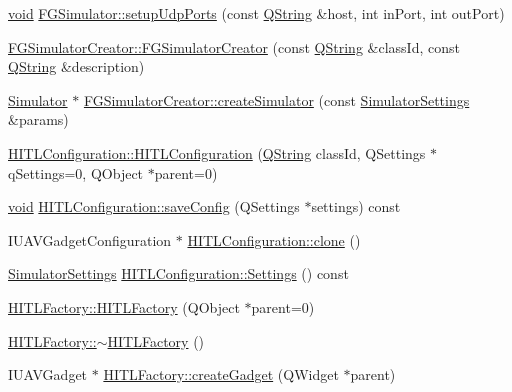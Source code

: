 \begin{DoxyCompactItemize}
\item 
\hyperlink{group___u_a_v_objects_plugin_ga444cf2ff3f0ecbe028adce838d373f5c}{void} \hyperlink{group___h_i_t_l_plugin_ga806877c20e5dc15efd67bb1c5e4f0710}{\-F\-G\-Simulator\-::setup\-Udp\-Ports} (const \hyperlink{group___u_a_v_objects_plugin_gab9d252f49c333c94a72f97ce3105a32d}{\-Q\-String} \&host, int in\-Port, int out\-Port)
\item 
\hyperlink{group___h_i_t_l_plugin_ga5a9c061b4c449fceecb71b3e00412cd3}{\-F\-G\-Simulator\-Creator\-::\-F\-G\-Simulator\-Creator} (const \hyperlink{group___u_a_v_objects_plugin_gab9d252f49c333c94a72f97ce3105a32d}{\-Q\-String} \&class\-Id, const \hyperlink{group___u_a_v_objects_plugin_gab9d252f49c333c94a72f97ce3105a32d}{\-Q\-String} \&description)
\item 
\hyperlink{class_simulator}{\-Simulator} $\ast$ \hyperlink{group___h_i_t_l_plugin_gae7287ea22cde35ce9042e313d9d7c14f}{\-F\-G\-Simulator\-Creator\-::create\-Simulator} (const \hyperlink{group___h_i_t_l_plugin_ga052199f1328d3002bce3e45345aa7f4e}{\-Simulator\-Settings} \&params)
\item 
\hyperlink{group___h_i_t_l_plugin_ga7d0ecee89fe45b55113d77ae668a7777}{\-H\-I\-T\-L\-Configuration\-::\-H\-I\-T\-L\-Configuration} (\hyperlink{group___u_a_v_objects_plugin_gab9d252f49c333c94a72f97ce3105a32d}{\-Q\-String} class\-Id, \-Q\-Settings $\ast$q\-Settings=0, \-Q\-Object $\ast$parent=0)
\item 
\hyperlink{group___u_a_v_objects_plugin_ga444cf2ff3f0ecbe028adce838d373f5c}{void} \hyperlink{group___h_i_t_l_plugin_ga8ae31be95aaf6385511e9387aa0a49b3}{\-H\-I\-T\-L\-Configuration\-::save\-Config} (\-Q\-Settings $\ast$settings) const 
\item 
\-I\-U\-A\-V\-Gadget\-Configuration $\ast$ \hyperlink{group___h_i_t_l_plugin_gaf448a961e8785490a4dcc5187d7edbe6}{\-H\-I\-T\-L\-Configuration\-::clone} ()
\item 
\hyperlink{group___h_i_t_l_plugin_ga052199f1328d3002bce3e45345aa7f4e}{\-Simulator\-Settings} \hyperlink{group___h_i_t_l_plugin_ga993f772c2a086edf053d851849caa984}{\-H\-I\-T\-L\-Configuration\-::\-Settings} () const 
\item 
\hyperlink{group___h_i_t_l_plugin_ga855bda20fa1058c99d4d1aa499fe694e}{\-H\-I\-T\-L\-Factory\-::\-H\-I\-T\-L\-Factory} (\-Q\-Object $\ast$parent=0)
\item 
\hyperlink{group___h_i_t_l_plugin_ga823205c59cff49942e94bc11bb2c4050}{\-H\-I\-T\-L\-Factory\-::$\sim$\-H\-I\-T\-L\-Factory} ()
\item 
\-I\-U\-A\-V\-Gadget $\ast$ \hyperlink{group___h_i_t_l_plugin_ga9a06cbbd0b0cd343e48b0386f1ebe45e}{\-H\-I\-T\-L\-Factory\-::create\-Gadget} (\-Q\-Widget $\ast$parent)

\end{DoxyCompactItemize}
